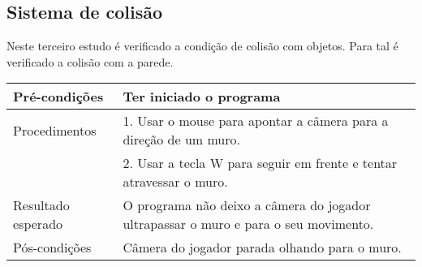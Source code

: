 \subsection{Sistema de colisão}\label{label}

Neste terceiro estudo é verificado a condição de colisão com objetos. Para tal é verificado a colisão com a parede.\\
	
\begin{tabular}{>{\centering}p{3.5cm}<{\centering}p{3.5cm}}
\hline
Pré-condições  & Ter iniciado o programa
\tabularnewline
\hline
Procedimentos 
& 1. Usar o mouse para apontar a câmera para a direção de um muro.\tabularnewline
& 2. Usar a tecla W para seguir em frente e tentar atravessar o muro.
\tabularnewline\hline
Resultado esperado & O programa não deixo a câmera do jogador ultrapassar o muro e para o seu movimento.
\tabularnewline\hline
Pós-condições & Câmera do jogador parada olhando para o muro.
\end{tabular}


